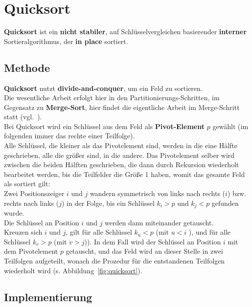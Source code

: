 \section{Quicksort}

\textbf{Quicksort} ist ein \textbf{nicht stabiler}, auf Schlüsselvergleichen basierender \textbf{interner} Sortieralgorithmus, der \textbf{in place} sortiert.

\subsection{Methode}

\textbf{Quicksort} nutzt \textbf{divide-and-conquer}, um ein Feld zu sortieren.\\
Die wesentliche Arbeit erfolgt hier in den Partitionierungs-Schritten, im Gegensatz zu \textbf{Merge-Sort}, hier findet die eigentliche Arbeit im Merge-Schritt statt (vgl.~\cite[174]{GD18e}).\\

\noindent
Bei Quicksort  wird ein Schlüssel aus dem Feld als \textbf{Pivot-Element} $p$ gewählt (im folgenden immer das rechte einer Teilfolge).\\
Alle Schlüssel, die kleiner als das Pivotelement sind, werden in die eine Hälfte geschrieben, alle die größer sind, in die andere.
Das Pivotelement selber wird zwischen die beiden Hälften geschrieben, die dann durch Rekursion wiederholt bearbeitet werden, bis die Teilfelder die Größe $1$ haben, womit das gesamte Feld als sortiert gilt:\\
Zwei Positionszeiger $i$ und $j$ wandern symmetrisch von links nach rechts ($i$) bzw. rechts nach links ($j$) in der Folge, bis ein Schlüssel $k_i > p$ und $k_j < p$ gefunden wurde. \\
Die Schlüssel an Position $i$ und $j$ werden dann miteinander getauscht.\\
Kreuzen sich $i$ und $j$, gilt für alle Schlüssel $k_u < p$ (mit $u < i$ ), und für alle Schlüssel $k_v > p$ (mit $v > j$)).
In dem Fall wird der Schlüssel an Position $i$ mit dem Pivotelement $p$ getauscht, und das Feld wird an dieser Stelle in zwei Teilfolgen aufgeteilt, wonach die Prozedur für die entstandenen Teilfolgen wiederholt wird (s. Abbildung~\ref{fig:quicksort}).

\subsection{Implementierung}

